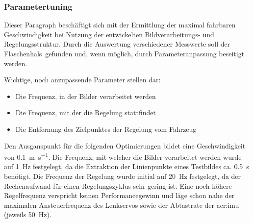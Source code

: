 \subsubsection{Parametertuning}
Dieser Paragraph beschäftigt sich mit der Ermittlung der maximal fahrbaren Geschwindigkeit bei Nutzung der entwickelten Bildverarbeitungs- und Regelungsstruktur. Durch die Auswertung verschiedener Messwerte soll der \glqq Flaschenhals\grqq\ gefunden und, wenn möglich, durch Parameteranpassung beseitigt werden.

Wichtige, noch anzupassende Parameter stellen dar:
\begin{itemize}
\item Die Frequenz, in der Bilder verarbeitet werden
\item Die Frequenz, mit der die Regelung stattfindet
\item Die Entfernung des Zielpunktes der Regelung vom Fahrzeug
\end{itemize}

Den Ausganspunkt für die folgenden Optimierungen bildet eine Geschwindigkeit von
\SI{0.1}{\metre\per\second}. Die Frequenz, mit welcher die Bilder verarbeitet werden wurde auf \SI{1}{\hertz} festgelegt, da die Extraktion der Linienpunkte eines Testbildes ca. \SI{0.5}{\second} benötigt. Die Frequenz der Regelung wurde initial auf \SI{20}{\hertz} festgelegt, da der Rechenaufwand für einen Regelungszyklus sehr gering ist. Eine noch höhere Regelfrequenz verspricht keinen Performancegewinn und läge schon nahe der maximalen Ansteuerfrequenz des Lenkservos sowie der Abtastrate der \gls{acr:imu} (jeweils \SI{50}{\hertz}).

